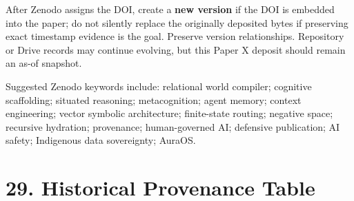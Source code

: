 \documentclass[
  10pt,
  letterpaper,
]{article}
\begin{document}
After Zenodo assigns the DOI, create a \textbf{new version} if the DOI
is embedded into the paper; do not silently replace the originally
deposited bytes if preserving exact timestamp evidence is the goal.
Preserve version relationships. Repository or Drive records may continue
evolving, but this Paper X deposit should remain an as-of snapshot.

Suggested Zenodo keywords include: relational world compiler; cognitive
scaffolding; situated reasoning; metacognition; agent memory; context
engineering; vector symbolic architecture; finite-state routing;
negative space; recursive hydration; provenance; human-governed AI;
defensive publication; AI safety; Indigenous data sovereignty; AuraOS.

\section{29. Historical Provenance
Table}\label{29-historical-provenance-table}
\end{document}
